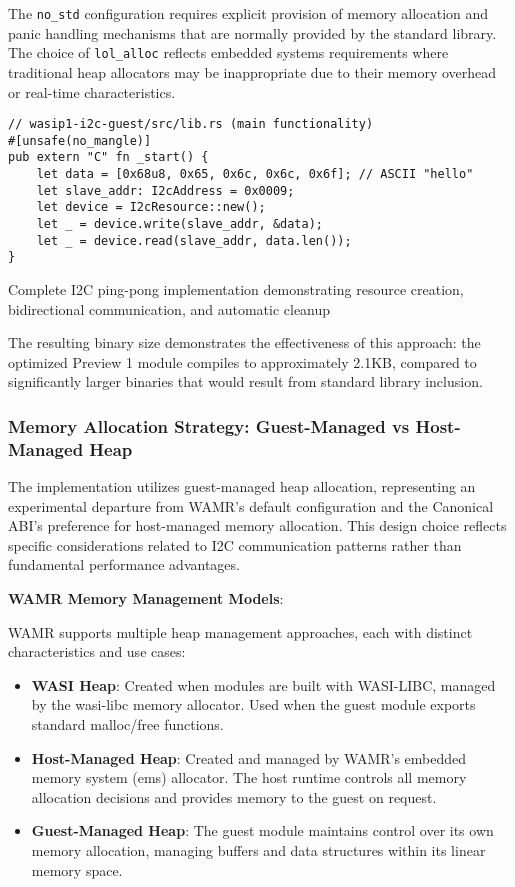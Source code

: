 The \texttt{no\_std} configuration requires explicit provision of memory allocation and panic handling mechanisms that are normally provided by the standard library. The choice of \texttt{lol\_alloc} reflects embedded systems requirements where traditional heap allocators may be inappropriate due to their memory overhead or real-time characteristics.

\begin{listing}[H]
\begin{verbatim}
// wasip1-i2c-guest/src/lib.rs (main functionality)
#[unsafe(no_mangle)]
pub extern "C" fn _start() {
    let data = [0x68u8, 0x65, 0x6c, 0x6c, 0x6f]; // ASCII "hello"
    let slave_addr: I2cAddress = 0x0009;
    let device = I2cResource::new();
    let _ = device.write(slave_addr, &data);
    let _ = device.read(slave_addr, data.len());
}
\end{verbatim}
\caption{Complete I2C ping-pong implementation demonstrating resource creation, bidirectional communication, and automatic cleanup}
\label{lst:preview1-main-functionality}
\end{listing}

The resulting binary size demonstrates the effectiveness of this approach: the optimized Preview 1 module compiles to approximately 2.1KB, compared to significantly larger binaries that would result from standard library inclusion.

\subsubsection{Memory Allocation Strategy: Guest-Managed vs Host-Managed Heap}

The implementation utilizes guest-managed heap allocation, representing an experimental departure from WAMR's default configuration and the Canonical ABI's preference for host-managed memory allocation. This design choice reflects specific considerations related to I2C communication patterns rather than fundamental performance advantages.

\textbf{WAMR Memory Management Models}:

WAMR supports multiple heap management approaches, each with distinct characteristics and use cases:

\begin{itemize}
    \item \textbf{WASI Heap}: Created when modules are built with WASI-LIBC, managed by the wasi-libc memory allocator. Used when the guest module exports standard malloc/free functions.
    \item \textbf{Host-Managed Heap}: Created and managed by WAMR's embedded memory system (ems) allocator. The host runtime controls all memory allocation decisions and provides memory to the guest on request.
    \item \textbf{Guest-Managed Heap}: The guest module maintains control over its own memory allocation, managing buffers and data structures within its linear memory space.
\end{itemize}

